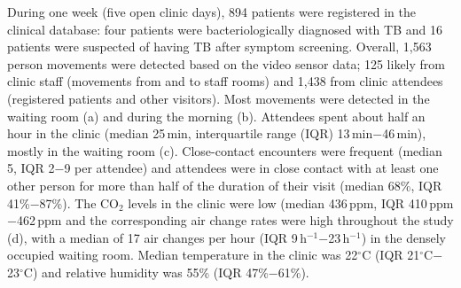 \documentclass[fleqn,11pt]{wlscirep}
\begin{document}
During one week (five open clinic days), 894 patients were registered in the clinical database: four patients were bacteriologically diagnosed with TB and 16 patients were suspected of having TB after symptom screening. Overall, 1,563 person movements were detected based on the video sensor data; 125 likely from clinic staff (movements from and to staff rooms) and 1,438 from clinic attendees (registered patients and other visitors). Most movements were detected in the waiting room (a) and during the morning (b). Attendees spent about half an hour in the clinic (median 25\,min, interquartile range (IQR) 13\,min$-$46\,min), mostly in the waiting room (c). Close-contact encounters were frequent (median 5, IQR 2$-$9 per attendee) and attendees were in close contact with at least one other person for more than half of the duration of their visit (median 68\%, IQR 41\%$-$87\%). The CO$_2$ levels in the clinic were low (median 436\,ppm, IQR 410\,ppm$-$462\,ppm  and the corresponding air change rates were high throughout the study (d), with a median of 17 air changes per hour (IQR 9\,h$^{-1}$$-$23\,h$^{-1}$) in the densely occupied waiting room.  Median temperature in the clinic was 22$^{\circ}$C (IQR 21$^{\circ}$C$-$23$^{\circ}$C) and relative humidity was 55\% (IQR 47\%$-$61\%).
\end{document}
